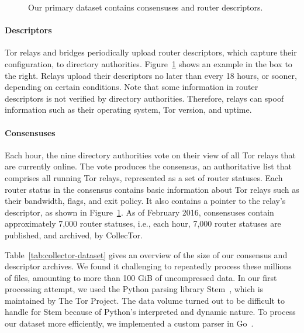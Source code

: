 \begin{figure}[t]
\caption{Our primary dataset contains consensuses and router descriptors.}
\label{fig:datasets}
\end{figure}

\paragraph{Descriptors} Tor relays and bridges periodically upload router
descriptors, which capture their configuration, to directory authorities.
Figure~\ref{fig:datasets} shows an example in the box to the right.  Relays
upload their descriptors no later than every 18 hours, or sooner, depending on
certain conditions.  Note that some information in router descriptors is not
verified by directory authorities.  Therefore, relays can spoof information such
as their operating system, Tor version, and uptime.

\paragraph{Consensuses} Each hour, the nine directory authorities vote on their
view of all Tor relays that are currently online.  The vote produces the
consensus, an authoritative list that comprises all running Tor relays,
represented as a set of router statuses.  Each router status in the consensus
contains basic information about Tor relays such as their bandwidth, flags, and
exit policy.  It also contains a pointer to the relay's descriptor, as shown in
Figure~\ref{fig:datasets}.  As of February 2016, consensuses contain
approximately 7,000 router statuses, i.e., each hour, 7,000 router statuses are
published, and archived, by CollecTor.

Table~\ref{tab:collector-dataset} gives an overview of the size of our consensus
and descriptor archives.  We found it challenging to repeatedly process these
millions of files, amounting to more than 100 GiB of uncompressed data.  In our
first processing attempt, we used the Python parsing library Stem~\cite{stem},
which is maintained by The Tor Project.  The data volume turned out to be
difficult to handle for Stem because of Python's interpreted and dynamic nature.
To process our dataset more efficiently, we implemented a custom parser in
Go~\cite{zoossh}.

